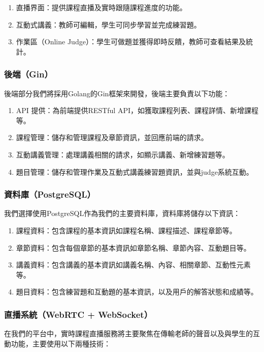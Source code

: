 \documentclass[12pt]{article}
\begin{document}
\begin{enumerate}[label=\textbullet, noitemsep]
  \item 直播界面：提供課程直播及實時跟隨課程進度的功能。
  \item 互動式講義：教師可編輯，學生可同步學習並完成練習題。
  \item 作業區（Online Judge）：學生可做題並獲得即時反饋，教師可查看結果及統計。
\end{enumerate}

\subsubsection{後端（Gin）}
後端部分我們將採用Golang的Gin框架來開發，後端主要負責以下功能：

\begin{enumerate}[label=\textbullet, noitemsep]
  \item API 提供：為前端提供RESTful API，如獲取課程列表、課程詳情、新增課程等。
  \item 課程管理：儲存和管理課程及章節資訊，並回應前端的請求。
  \item 互動講義管理：處理講義相關的請求，如顯示講義、新增練習題等。
  \item 題目管理：儲存和管理作業及互動式講義練習題資訊，並與judge系統互動。
\end{enumerate}

\subsubsection{資料庫（PostgreSQL）}
我們選擇使用PostgreSQL作為我們的主要資料庫，資料庫將儲存以下資訊：

\begin{enumerate}[label=\textbullet, noitemsep]
  \item 課程資料：包含課程的基本資訊如課程名稱、課程描述、課程章節等。
  \item 章節資料：包含每個章節的基本資訊如章節名稱、章節內容、互動題目等。
  \item 講義資料：包含講義的基本資訊如講義名稱、內容、相關章節、互動性元素等。
  \item 題目資料：包含練習題和互動題的基本資訊，以及用戶的解答狀態和成績等。
\end{enumerate}

\subsubsection{直播系統（WebRTC + WebSocket）}
在我們的平台中，實時課程直播服務將主要聚焦在傳輸老師的聲音以及與學生的互動功能，主要使用以下兩種技術：
\end{document}
